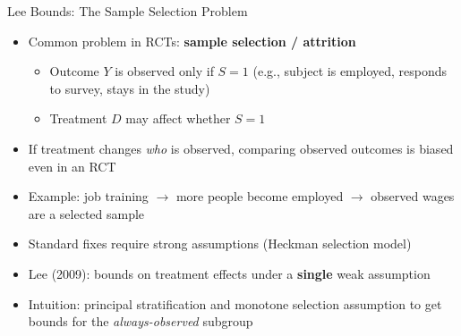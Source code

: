 \documentclass[10pt]{beamer}
\begin{document}
\begin{frame}{Lee Bounds: The Sample Selection Problem}
  \begin{itemize}
    \item Common problem in RCTs: \textbf{sample selection / attrition}
      \begin{itemize}
        \item Outcome $Y$ is observed only if $S = 1$ (e.g., subject is employed, responds to survey, stays in the study)
        \item Treatment $D$ may affect whether $S = 1$
      \end{itemize}
    \item If treatment changes \textit{who} is observed, comparing observed outcomes is biased even in an RCT
    \item Example: job training $\to$ more people become employed $\to$ observed wages are a selected sample
    \item Standard fixes require strong assumptions (Heckman selection model)
    \item Lee (2009): bounds on treatment effects under a \textbf{single} weak assumption
    \item Intuition: principal stratification and monotone selection assumption to get bounds for the \textit{always-observed} subgroup
  \end{itemize}
\end{frame}
\end{document}
